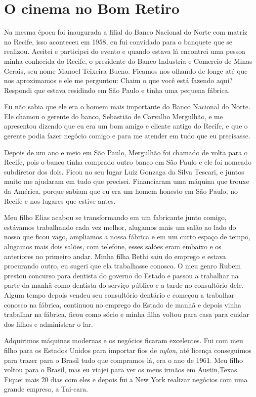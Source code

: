\chapter{O cinema no Bom Retiro}

Na mesma época foi inaugurada a filial do Banco Nacional do Norte com
matriz no Recife, isso aconteceu em 1958, eu fui convidado para o
banquete que se realizou. Aceitei e participei do evento e quando estava
lá encontrei uma pessoa minha conhecida do Recife, o presidente do Banco
Industria e Comercio de Minas Gerais, seu nome Manoel Teixeira Bueno.
Ficamos nos olhando de longe até que nos aproximamos e ele me perguntou:
Chaim o que você está fazendo aqui? Respondi que estava residindo em São
Paulo e tinha uma pequena fábrica.

Eu não sabia que ele era o homem mais importante do Banco Nacional do
Norte. Ele chamou o gerente do banco, Sebastião de Carvalho Mergulhão, e
me apresentou dizendo que eu era um bom amigo e cliente antigo do
Recife, e que o gerente podia fazer negócio comigo e para me atender em
tudo que eu precisasse.

Depois de um ano e meio em São Paulo, Mergulhão foi chamado de volta
para o Recife, pois o banco tinha comprado outro banco em São Paulo e
ele foi nomeado subdiretor dos dois. Ficou no seu lugar Luiz Gonzaga da
Silva Tescari, e juntos muito me ajudaram em tudo que precisei.
Financiaram uma máquina que trouxe da América, porque sabiam que eu era
um homem honesto em São Paulo, no Recife e nos lugares que estive antes.

Meu filho Elias acabou se transformando em um fabricante junto comigo,
estávamos trabalhando cada vez melhor, alugamos mais um salão ao lado do
nosso que ficou vago, ampliamos a nossa fábrica e em um curto espaço de
tempo, alugamos mais dois salões, com telefone, esses salões eram
embaixo e os anteriores no primeiro andar. Minha filha Bethi saiu do
emprego e estava procurando outro, eu sugeri que ela trabalhasse
conosco. O meu genro Rubem prestou concurso para dentista do governo do
Estado e passou a trabalhar na parte da manhã como dentista do serviço
público e a tarde no consultório dele. Algum tempo depois vendeu seu
consultório dentário e começou a trabalhar conosco na fábrica, continuou
no emprego do Estado de manhã e depois vinha trabalhar na fábrica, ficou
como sócio e minha filha voltou para casa para cuidar dos filhos e
administrar o lar.

Adquirimos máquinas modernas e os negócios ficaram excelentes. Fui com
meu filho para os Estados Unidos para importar fios de \textit{nylon}, até
licença conseguimos para trazer para o Brasil tudo que compramos lá, era
o ano de 1961. Meu filho voltou para o Brasil, mas eu viajei para ver os
meus irmãos em Austin,Texas. Fiquei mais 20 dias com eles e depois fui a
New York realizar negócios com uma grande empresa, a Tai-cara.


